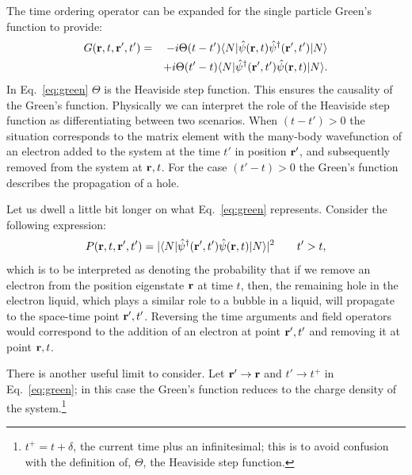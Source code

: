 The time ordering operator can be expanded for
the single particle Green's function to provide:
%
\begin{eqnarray}
\label{eq:green}
G({\bf r},t,{\bf r^\prime},t') & = & -i\Theta(t-t') \langle N|\hat{\psi}({\bf r},t)\hat{\psi}^{\dagger}({\bf r^\prime},t') |N \rangle \nonumber \\
	  	 	   &   & +i\Theta(t'-t) \langle N|\hat{\psi}^{\dagger}({\bf r^\prime},t')\hat{\psi}({\bf r},t) |N \rangle. 
\end{eqnarray}
%
In Eq.~\ref{eq:green} $\Theta$ is the Heaviside step function. This ensures the causality 
of the Green's function. Physically we can interpret the role of the Heaviside step function
as differentiating between two scenarios. When  $(t-t')>0$ the situation 
corresponds to the matrix element with the many-body wavefunction 
of an electron added to the system at the time $t'$ in position ${\bf r}'$, and subsequently removed
from the system at ${\bf r},t$. For the case $(t'-t)>0$ the Green's function describes the propagation
of a hole.

%
Let us dwell a little bit longer on what Eq.~\ref{eq:green} represents. 
Consider the following expression:
\begin{equation}
P({\bf r},t,{\bf r^\prime},t') = |\langle N|\hat{\psi}^{\dagger}({\bf r}',t')\hat{\psi}({\bf r},t)|N\rangle|^{2} \qquad t'>t,
\end{equation}
%
which is to be interpreted as denoting the probability that if we remove an electron from the 
position eigenstate ${\bf r}$ at time $t$, then, the remaining hole in the electron liquid, 
which plays a similar role to a bubble in a liquid, will propagate to the space-time point ${\bf r}',t'$. 
Reversing the time arguments and field operators would correspond to the 
addition of an electron at point ${\bf r}',t'$ and removing it at point ${\bf r},t$.
 
There is another useful limit to consider.
Let ${\bf r}' \rightarrow {\bf r}$ and $t' \rightarrow t^{+}$ 
in Eq.~\ref{eq:green}; in this case the Green's function reduces to the 
charge density of the system.\footnote{$t^{+} = t + \delta$, the 
current time plus an infinitesimal; this is to avoid confusion 
with the definition of, $\Theta$, the Heaviside step function.}

